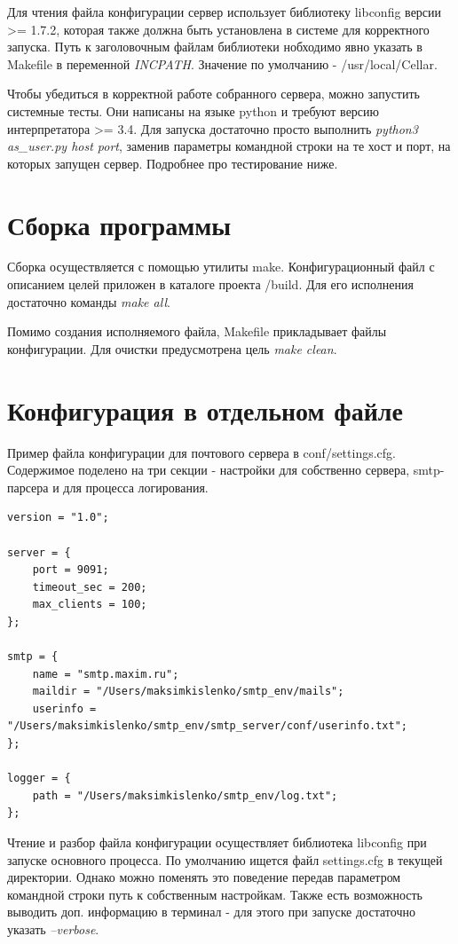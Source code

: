 \documentclass[a4paper,12pt]{report}
\begin{document}
Для чтения файла конфигурации сервер использует библиотеку libconfig версии >= 1.7.2, которая также должна быть установлена в системе для корректного запуска. Путь к заголовочным файлам библиотеки нобходимо явно указать в Makefile в переменной \textit{INCPATH}. Значение по умолчанию - /usr/local/Cellar.

Чтобы убедиться в корректной работе собранного сервера, можно запустить системные тесты. Они написаны на языке python и требуют версию интерпретатора >= 3.4. Для запуска достаточно просто выполнить \textit{python3 as_user.py host port}, заменив параметры командной строки на те хост и порт, на которых запущен сервер. Подробнее про тестирование ниже.

\section{Сборка программы}

Сборка осуществляется с помощью утилиты make. Конфигурационный файл с описанием целей приложен в каталоге проекта /build. Для его исполнения достаточно команды \textit{make all}.

Помимо создания исполняемого файла, Makefile прикладывает файлы конфигурации. Для очистки предусмотрена цель \textit{make clean}.

\section{Конфигурация в отдельном файле}

Пример файла конфигурации для почтового сервера в conf/settings.cfg. Содержимое поделено на три секции - настройки для собственно сервера, smtp-парсера и для процесса логирования.

\begin{verbatim}
version = "1.0";

server = {
    port = 9091;
    timeout_sec = 200;
    max_clients = 100;
};

smtp = {
    name = "smtp.maxim.ru";
    maildir = "/Users/maksimkislenko/smtp_env/mails";
    userinfo = "/Users/maksimkislenko/smtp_env/smtp_server/conf/userinfo.txt";
};

logger = {
    path = "/Users/maksimkislenko/smtp_env/log.txt";
};

\end{verbatim}

Чтение и разбор файла конфигурации осуществляет библиотека libconfig при запуске основного процесса. По умолчанию ищется файл settings.cfg в текущей директории. Однако можно поменять это поведение передав параметром командной строки путь к собственным настройкам. Также есть возможность выводить доп. информацию в терминал - для этого при запуске достаточно указать \textit{--verbose}.
\end{document}
